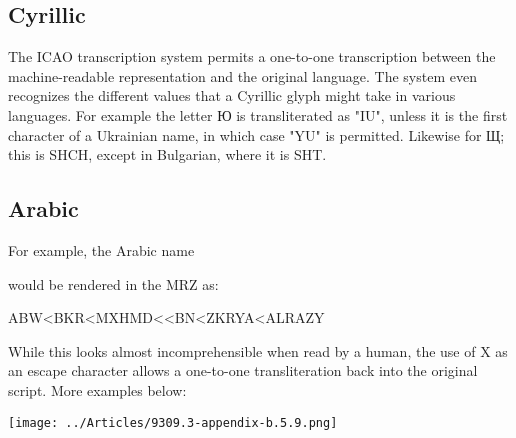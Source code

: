 \subsection{Cyrillic}

The ICAO transcription system permits a one-to-one transcription between the
machine-readable representation and the original language. The system even
recognizes the different values that a Cyrillic glyph might take in various
languages. For example the letter Ю is transliterated as "IU", unless it is the
first character of a Ukrainian name, in which case "YU" is permitted. Likewise
for Щ; this is SHCH, except in Bulgarian, where it is SHT.

\subsection{Arabic}

For example, the Arabic name


\rmfamily
would be rendered in the MRZ as:

ABW<BKR<MXHMD<<BN<ZKRYA<ALRAZY

While this looks almost incomprehensible when read by a human, the use of X as
an escape character allows a one-to-one transliteration back into the original
script. More examples below:

\texttt{[image: ../Articles/9309.3-appendix-b.5.9.png]}

